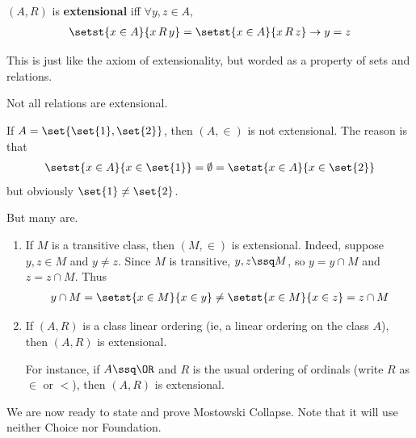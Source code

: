 
\begin{boxdefinition}[Extensionality]
    $(A, R)$ is \textbf{extensional} iff $\forall y, z \in A$,
    \begin{align*}
        \setst{x \in A}{x \, R \, y} = \setst{x \in A}{x \, R \, z}
        \to y = z
    \end{align*}
\end{boxdefinition}

This is just like the axiom of extensionality, but worded as a property of sets and relations.

Not all relations are extensional.

\begin{boxnexample} \hfill
    If $A = \set{\set{1}, \set{2}}$, then $(A, \in)$ is not extensional. The reason is that
    \begin{align*}
        \setst{x \in A}{x \in \set{1}} = \emptyset = \setst{x \in A}{x \in \set{2}}
    \end{align*}
    but obviously $\set{1} \ne \set{2}$.
\end{boxnexample}

But many are.

\begin{boxexample} \hfill
    \begin{enumerate}
        \item If $M$ is a transitive class, then $(M, \in)$ is extensional. Indeed, suppose $y, z \in M$ and $y \ne z$. Since $M$ is transitive, $y, z \ssq M$, so $y = y \cap M$ and $z = z \cap M$. Thus
            \begin{align*}
                y \cap M = \setst{x \in M}{x \in y} \neq \setst{x \in M}{x \in z} = z \cap M
            \end{align*}

        \item If $(A, R)$ is a class linear ordering (ie, a linear ordering on the class $A$), then $(A, R)$ is extensional.

        For instance, if $A \ssq \OR$ and $R$ is the usual ordering of ordinals (write $R$ as $\in$ or $<$), then $(A, R)$ is extensional.
    \end{enumerate}
\end{boxexample}

We are now ready to state and prove Mostowski Collapse. Note that it will use neither Choice nor Foundation.

